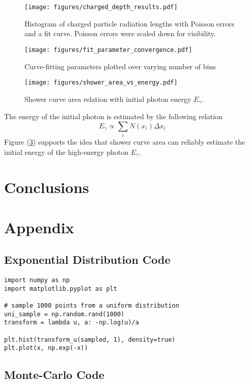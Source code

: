 \documentclass{article}
\begin{document}
\begin{figure}[htpb]
    \begin{center}
        \texttt{[image: figures/charged\_depth\_results.pdf]}
    \end{center}
    \caption{Histogram of charged particle radiation lengths with Poisson errors and a fit curve. Poisson errors were scaled down for visibility.}\label{fig:results}
\end{figure}

\begin{figure}
    \begin{center}
        \texttt{[image: figures/fit\_parameter\_convergence.pdf]}
    \end{center}
    \caption{Curve-fitting parameters plotted over varying number of bins}\label{fig:convergence}
\end{figure}

\begin{figure}
    \begin{center}
        \texttt{[image: figures/shower\_area\_vs\_energy.pdf]}
    \end{center}
    \caption{Shower curve area relation with initial photon energy \( E_\gamma \).}\label{fig:shower-area}
\end{figure}

The energy of the initial photon is estimated by the following relation
\begin{equation}
    E_\gamma \propto \sum_{i} N(x_i) \Delta x_i
\end{equation}
Figure (\ref{fig:shower-area}) supports the idea that shower curve area can reliably estimate the initial energy of the high-energy photon \( E_\gamma \).
\section{Conclusions} %
\label{sec:Conclusions}

\section{Appendix} %
\label{sec:Appendix}

\newpage
\subsection{Exponential Distribution Code} %
\label{sub:Exponential Distribution Code}
\begin{verbatim}
import numpy as np
import matplotlib.pyplot as plt

# sample 1000 points from a uniform distribution
uni_sample = np.random.rand(1000)
transform = lambda u, a: -np.log(u)/a

plt.hist(transform_u(sampled, 1), density=true)
plt.plot(x, np.exp(-x))
\end{verbatim}

\subsection{Monte-Carlo Code} %
\label{sub:Monte-Carlo Code}



\end{document}
